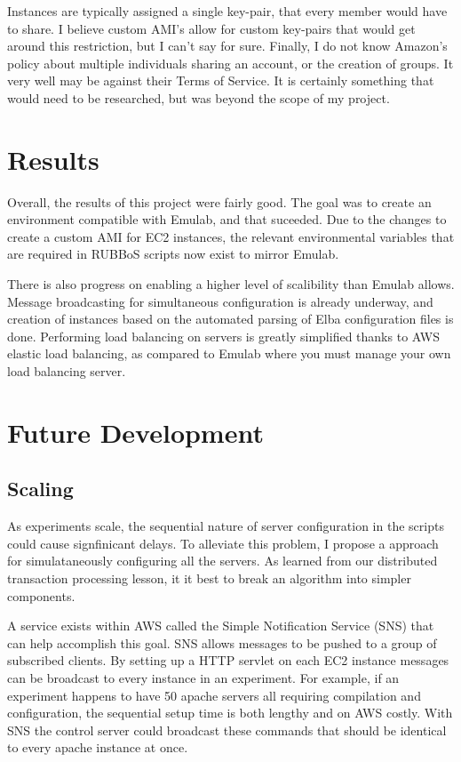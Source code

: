 \documentclass{article}
\begin{document}
Instances are typically assigned a single key-pair, that every member would have to share. I believe custom AMI's allow for custom key-pairs that would get around this restriction, but I can't say for sure.
Finally, I do not know Amazon's policy about multiple individuals sharing an account, or the creation of groups. It very well may be against their Terms of Service. It is certainly something that would need to be researched, but was beyond the scope of my project.
\section{Results}
Overall, the results of this project were fairly good. The goal was to create an environment compatible with Emulab, and that suceeded. Due to the changes to create a custom AMI for EC2 instances, the relevant environmental variables that are required in RUBBoS scripts now exist to mirror Emulab.

There is also progress on enabling a higher level of scalibility than Emulab allows. Message broadcasting for simultaneous configuration is already underway, and creation of instances based on the automated parsing of Elba configuration files is done. Performing load balancing on servers is greatly simplified thanks to AWS elastic load balancing, as compared to Emulab where you must manage your own load balancing server.
\section{Future Development}
\subsection{Scaling}
As experiments scale, the sequential nature of server configuration in the scripts could cause signfinicant delays. To alleviate this problem, I propose a approach for simulataneously configuring all the servers. As learned from our distributed transaction processing lesson, it it best to break an algorithm into simpler components.

A service exists within AWS called the Simple Notification Service (SNS) that can help accomplish this goal. SNS allows messages to be pushed to a group of subscribed clients. By setting up a HTTP servlet on each EC2 instance messages can be broadcast to every instance in an experiment. For example, if an experiment happens to have 50 apache servers all requiring compilation and configuration, the sequential setup time is both lengthy and on AWS costly. With SNS the control server could broadcast these commands that should be identical to every apache instance at once.
\end{document}
